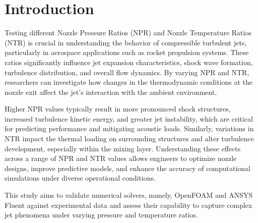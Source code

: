 \documentclass[12pt]{article}
\begin{document}
\section{Introduction}\label{sec:introduction}

Testing different Nozzle Pressure Ratios (NPR) and Nozzle Temperature Ratios (NTR) is crucial in understanding the behavior of compressible turbulent jets, particularly in aerospace applications such as rocket propulsion systems. These ratios significantly influence jet expansion characteristics, shock wave formation, turbulence distribution, and overall flow dynamics. By varying NPR and NTR, researchers can investigate how changes in the thermodynamic conditions at the nozzle exit affect the jet’s interaction with the ambient environment. 

Higher NPR values typically result in more pronounced shock structures, increased turbulence kinetic energy, and greater jet instability, which are critical for predicting performance and mitigating acoustic loads. Similarly, variations in NTR impact the thermal loading on surrounding structures and alter turbulence development, especially within the mixing layer. Understanding these effects across a range of NPR and NTR values allows engineers to optimize nozzle designs, improve predictive models, and enhance the accuracy of computational simulations under diverse operational conditions. 

This study aims to validate numerical solvers, namely, OpenFOAM and ANSYS Fluent against experimental data and assess their capability to capture complex jet phenomena under varying pressure and temperature ratios. 

\end{document}
